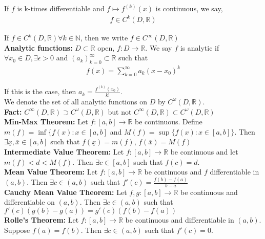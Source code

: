 \documentclass[12pt]{article}
\begin{document}
If $f$ is k-times differentiable and $f \mapsto f^{(k)}(x)$ is continuous, we say,
\begin{align*}
f \in C^k(D, \mathbb{R})
\end{align*}

If $f \in C^k(D, \mathbb{R}) \forall k \in \mathbb{N}$, then we write $f \in C^{\infty}(D, \mathbb{R})$\\

\textbf{Analytic functions:} $D \subset \mathbb{R}$ open, $f: D \to \mathbb{R}$. We say $f$ is analytic if $\forall x_0 \in D, \exists \epsilon > 0$ and $(a_k)_{k=0}^{\infty} \subset \mathbb{R}$ such that
\begin{align*}
f(x) = \sum_{k=0}^{\infty} a_k(x - x_0)^k
\end{align*}

If this is the case, then $a_k = \frac{f^{(k)}(x_0)}{k!}$.\\

We denote the set of all analytic functions on $D$ by $C^{\omega}(D, \mathbb{R})$.\\

\textbf{Fact:} $C^{\infty}(D, \mathbb{R}) \supset C^{\omega}(D, \mathbb{R})$ but not $C^{\infty}(D, \mathbb{R}) \subset C^{\omega}(D, \mathbb{R})$\\

\textbf{Min-Max Theorem:} Let $f: [a, b] \to \mathbb{R}$ be continuous. Define $m(f) = \inf \{f(x): x \in [a,b]$ and $M(f) = \sup \{f(x): x \in [a, b]\}$. Then $\exists \underline{x}, \overline{x} \in [a, b]$ such that $f(\underline{x}) = m(f)$, $f(\overline{x}) = M(f)$\\

\textbf{Intermediate Value Theorem:} Let $f: [a, b] \to \mathbb{R}$ be continuous and let $m(f) < d < M(f)$. Then $\exists c \in [a,b]$ such that $f(c) = d$.\\

\textbf{Mean Value Theorem:} Let $f: [a, b] \to \mathbb{R}$ be continuous and $f$ differentiable in $(a, b)$. Then $\exists c \in (a, b)$ such that $f'(c) = \frac{f(b) - f(a)}{b - a}$\\

\textbf{Cauchy Mean Value Theorem:} Let $f, g: [a, b] \to \mathbb{R}$ be continuous and differentiable on $(a, b)$. Then $\exists c \in (a, b)$ such that $f'(c)\left(g(b) - g(a) \right) = g'(c) \left( f(b) - f(a) \right)$\\

\textbf{Rolle's Theorem:} Let $f: [a, b] \to \mathbb{R}$ be continuous and differentiable in $(a, b)$. Suppose $f(a) = f(b)$. Then $\exists c \in (a, b)$ such that $f'(c) = 0$.\\
\end{document}
